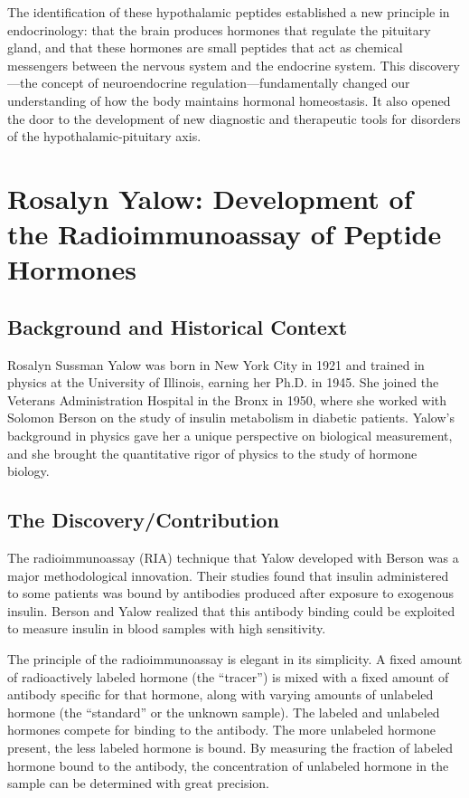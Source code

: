 The identification of these hypothalamic peptides established a new principle in endocrinology: that the brain produces hormones that regulate the pituitary gland, and that these hormones are small peptides that act as chemical messengers between the nervous system and the endocrine system. This discovery---the concept of neuroendocrine regulation---fundamentally changed our understanding of how the body maintains hormonal homeostasis. It also opened the door to the development of new diagnostic and therapeutic tools for disorders of the hypothalamic-pituitary axis.

\section[Rosalyn Yalow: Development of the]{Rosalyn Yalow: Development of the Radioimmunoassay of Peptide Hormones}

\subsection{Background and Historical Context}

Rosalyn Sussman Yalow was born in New York City in 1921 and trained in physics at the University of Illinois, earning her Ph.D. in 1945. She joined the Veterans Administration Hospital in the Bronx in 1950, where she worked with Solomon Berson on the study of insulin metabolism in diabetic patients. Yalow's background in physics gave her a unique perspective on biological measurement, and she brought the quantitative rigor of physics to the study of hormone biology.

\subsection{The Discovery/Contribution}

The radioimmunoassay (RIA) technique that Yalow developed with Berson was a major methodological innovation. Their studies found that insulin administered to some patients was bound by antibodies produced after exposure to exogenous insulin. Berson and Yalow realized that this antibody binding could be exploited to measure insulin in blood samples with high sensitivity.

The principle of the radioimmunoassay is elegant in its simplicity. A fixed amount of radioactively labeled hormone (the ``tracer'') is mixed with a fixed amount of antibody specific for that hormone, along with varying amounts of unlabeled hormone (the ``standard'' or the unknown sample). The labeled and unlabeled hormones compete for binding to the antibody. The more unlabeled hormone present, the less labeled hormone is bound. By measuring the fraction of labeled hormone bound to the antibody, the concentration of unlabeled hormone in the sample can be determined with great precision.

